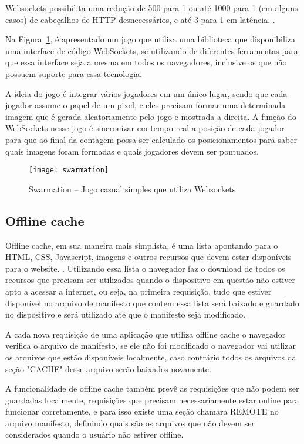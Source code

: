Websockets possibilita uma redução de 500 para 1 ou até 1000 para 1
(em alguns casos) de cabeçalhos de HTTP desnecessários, e até 3 para 1
em latência. \cite{lubbers2010pro}.

Na Figura~\ref{img:swarmation}, é apresentado um jogo que utiliza
uma biblioteca que disponibiliza uma interface de código WebSockets,
se utilizando de diferentes ferramentas para que essa interface seja a mesma em
todos os navegadores, inclusive os que não possuem suporte para essa
tecnologia.

A ideia do jogo é integrar vários jogadores em um único lugar, sendo que
cada jogador assume o papel de um pixel, e eles precisam formar uma
determinada imagem que é gerada aleatoriamente pelo jogo e mostrada a
direita. A função do WebSockets nesse jogo é sincronizar em tempo real a
posição de cada jogador para que ao final da contagem possa ser
calculado os posicionamentos para saber quais imagens foram formadas e
quais jogadores devem ser pontuados.

\begin{figure}[H]
  \centering
	\texttt{[image: swarmation]}
  \caption{Swarmation {--} Jogo casual simples que utiliza Websockets}
  \label{img:swarmation}
\end{figure}

\clearpage


\subsection{Offline cache}

Offline cache, em sua maneira mais simplista, é uma lista apontando
para o HTML, CSS, Javascript, imagens e outros recursos que devem
estar disponíveis para o website. \cite{pilgrim2010html5}. Utilizando
essa lista o navegador faz o download de todos os recursos que
precisam ser utilizados quando o dispositivo em questão não estiver
apto a acessar a internet, ou seja, na primeira requisição, tudo que estiver
disponível no arquivo de manifesto que contem essa lista será baixado
e guardado no dispositivo e será utilizado até que o manifesto seja
modificado.

A cada nova requisição de uma aplicação que utiliza offline cache o
navegador verifica o arquivo de manifesto, se ele não foi modificado
o navegador vai utilizar os arquivos que estão disponíveis localmente,
caso contrário todos os arquivos da seção "CACHE" desse arquivo serão baixados novamente.

A funcionalidade de offline cache também prevê as requisições que não
podem ser guardadas localmente, requisições que precisam
necessariamente estar online para funcionar corretamente, e para isso
existe uma seção chamara REMOTE no arquivo manifesto, definindo quais
são os arquivos que não devem ser considerados quando o usuário não
estiver offline.

